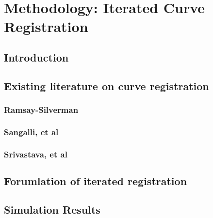 \chapter{Methodology: Iterated Curve Registration}

\section{Introduction}

\section{Existing literature on curve registration}
\subsection{Ramsay-Silverman}
\subsection{Sangalli, et al}
\subsection{Srivastava, et al}

\section{Forumlation of iterated registration}

\section{Simulation Results}


